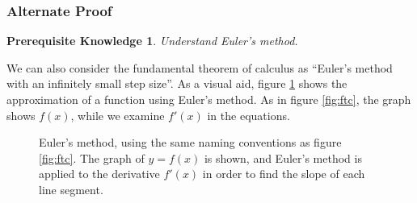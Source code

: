 \documentclass{myarticle}
\theoremstyle{nospace}
\newtheorem*{oldprereq}{Prerequisite Knowledge}
\newenvironment{prereq}
{\begin{mdframed}\begin{oldprereq}}
    {\end{oldprereq}\end{mdframed}}
\newtheorem{old series theorem}{Theorem}
\newenvironment{series theorem}
{\begin{mdframed}\begin{old series theorem}}
    {\end{old series theorem}\end{mdframed}}
\begin{document}
\subsubsection{Alternate Proof}
\label{sec:ftc alternate proof}

\begin{prereq}
  Understand Euler's method.
\end{prereq}

We can also consider the fundamental theorem of calculus as ``Euler's
method with an infinitely small step size''. As a visual aid, figure
\ref{fig:euler's method} shows the approximation of a function using
Euler's method. As in figure \ref{fig:ftc}, the graph shows $f(x)$,
while we examine $f'(x)$ in the equations.

\begin{figure}[htb!] \centering
  \caption{Euler's method, using the same naming conventions as figure
    \ref{fig:ftc}. The graph of $y = f(x)$ is shown, and Euler's
    method is applied to the derivative $f'(x)$ in order to find the
    slope of each line segment.}
  \label{fig:euler's method}
\end{figure}
\end{document}

